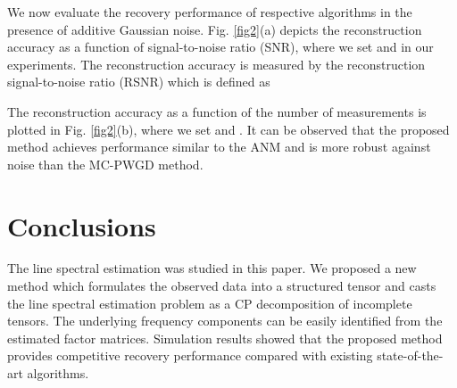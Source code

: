 \documentclass[10pt,journal,epsfig]{IEEEtran}
\begin{document}
We now evaluate the recovery performance of respective algorithms
in the presence of additive Gaussian noise. Fig. \ref{fig2}(a)
depicts the reconstruction accuracy as a function of
signal-to-noise ratio (SNR), where we set  and  in our
experiments. The reconstruction accuracy is measured by the
reconstruction signal-to-noise ratio (RSNR) which is defined as

The reconstruction accuracy as a function of the number of
measurements  is plotted in Fig. \ref{fig2}(b), where we set
 and . It can be observed that the
proposed method achieves performance similar to the ANM and is
more robust against noise than the MC-PWGD method.










\section{Conclusions}
The line spectral estimation was studied in this paper. We
proposed a new method which formulates the observed data into a
structured tensor and casts the line spectral estimation problem
as a CP decomposition of incomplete tensors. The underlying
frequency components can be easily identified from the estimated
factor matrices. Simulation results showed that the proposed
method provides competitive recovery performance compared with
existing state-of-the-art algorithms.











\end{document}
